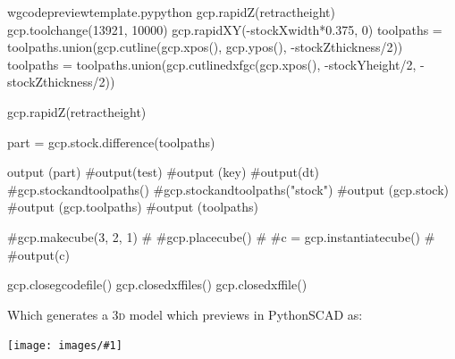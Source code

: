 \documentclass{ltxdoc}
\newcommand{\includeimage}[1]{\bigskip\noindent\texttt{[image: images/\#1]}\bigskip}
\begin{document}
\begin{writecode}{w}{gcodepreviewtemplate.py}{python}
gcp.rapidZ(retractheight)
gcp.toolchange(13921, 10000)
gcp.rapidXY(-stockXwidth*0.375, 0)
toolpaths = toolpaths.union(gcp.cutline(gcp.xpos(), gcp.ypos(), -stockZthickness/2))
toolpaths = toolpaths.union(gcp.cutlinedxfgc(gcp.xpos(), -stockYheight/2, -stockZthickness/2))

gcp.rapidZ(retractheight)

part = gcp.stock.difference(toolpaths)

output (part)
#output(test)
#output (key)
#output(dt)
#gcp.stockandtoolpaths()
#gcp.stockandtoolpaths("stock")
#output (gcp.stock)
#output (gcp.toolpaths)
#output (toolpaths)

#gcp.makecube(3, 2, 1)
#
#gcp.placecube()
#
#c = gcp.instantiatecube()
#
#output(c)

gcp.closegcodefile()
gcp.closedxffiles()
gcp.closedxffile()
\end{writecode}
\addtocounter{gcptmplpy}{138}

\begin{samepage}
\noindent Which generates a \textsc{3d} model which previews in PythonSCAD as:

\bigskip

\includeimage{gcodepreviewtemplate.png}
\end{samepage}
\end{document}
